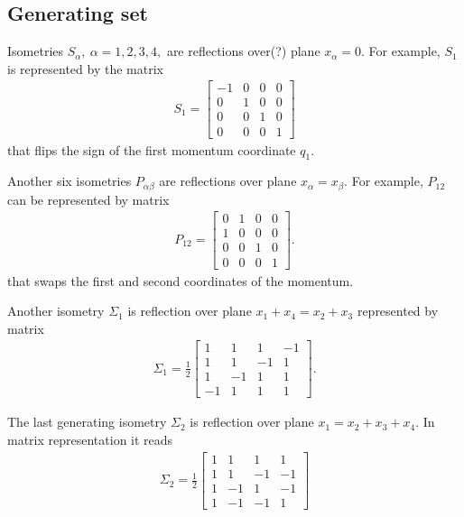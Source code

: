 \subsection{Generating set}
Isometries $S_{\alpha},~\alpha=1,2,3,4,$ are reflections over(?) plane $x_{\alpha} = 0$.
For example, $S_{1}$ is represented by the matrix
\begin{align}
S_1 = 
\left[\begin{array}{rrrr}
-1 & 0 & 0 & 0 \\
 0 & 1 & 0 & 0 \\
 0 & 0 & 1 & 0 \\
 0 & 0 & 0 & 1
\end{array}\right]
\end{align} 
that flips the sign of the first momentum coordinate $q_{1}$.

\bigskip

Another six isometries $P_{\alpha \beta}$ are reflections over plane $x_{\alpha} = x_{\beta}$.
For example, $P_{12}$ can be represented by matrix
\begin{align}
P_{12} =
\begin{bmatrix}
0 & 1 & 0 & 0 \\
1 & 0 & 0 & 0 \\
0 & 0 & 1 & 0 \\
0 & 0 & 0 & 1
\end{bmatrix}.
\end{align}
that swaps the first and second coordinates of the momentum.

Another isometry $\Sigma_1$ is reflection over plane $x_1 + x_4 = x_2 + x_3$ represented by matrix
\begin{align}
\Sigma_1 = \frac{1}{2}
\left[\begin{array}{rrrr}
1 & 1 & 1 & -1 \\
1 & 1 & -1 & 1 \\
1 & -1 & 1 & 1 \\
-1 & 1 & 1 & 1
\end{array}\right].
\end{align}

The last generating isometry $\Sigma_2$ is reflection over plane $x_1 = x_2 + x_3 + x_4$.
In matrix representation it reads
\begin{align}
\Sigma_2 = \frac{1}{2}
\left[\begin{array}{rrrr}
1 & 1 & 1 & 1 \\
1 & 1 & -1 & -1 \\
1 & -1 & 1 & -1 \\
1 & -1 & -1 & 1
\end{array}\right]
\end{align}

